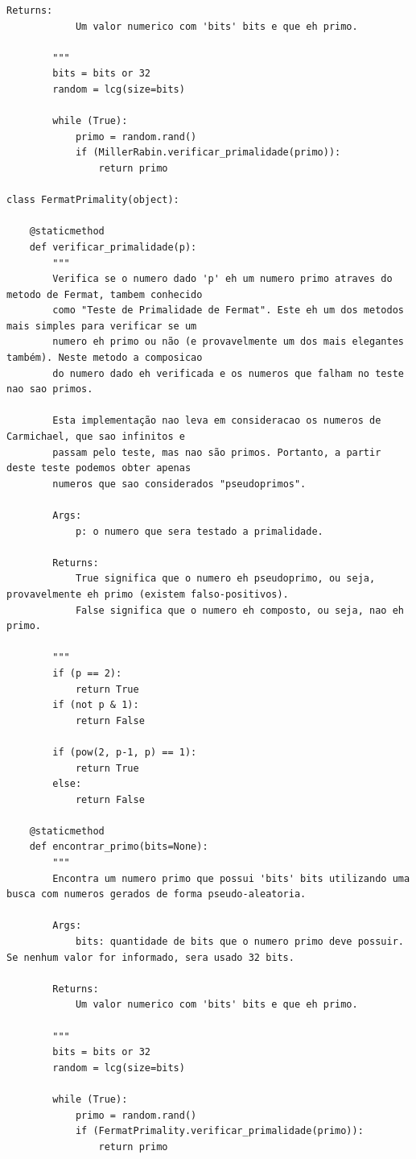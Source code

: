 \documentclass[a4paper,11pt]{article}
\theoremstyle{mytheor}
\begin{document}
\begin{lstlisting}[caption=Arquivo primality.py.]
        Returns:
            Um valor numerico com 'bits' bits e que eh primo.

        """
        bits = bits or 32
        random = lcg(size=bits)

        while (True):
            primo = random.rand()
            if (MillerRabin.verificar_primalidade(primo)):
                return primo

class FermatPrimality(object):

    @staticmethod
    def verificar_primalidade(p):
        """
        Verifica se o numero dado 'p' eh um numero primo atraves do metodo de Fermat, tambem conhecido 
        como "Teste de Primalidade de Fermat". Este eh um dos metodos mais simples para verificar se um 
        numero eh primo ou não (e provavelmente um dos mais elegantes também). Neste metodo a composicao
        do numero dado eh verificada e os numeros que falham no teste nao sao primos.

        Esta implementação nao leva em consideracao os numeros de Carmichael, que sao infinitos e
        passam pelo teste, mas nao são primos. Portanto, a partir deste teste podemos obter apenas
        numeros que sao considerados "pseudoprimos".

        Args:
            p: o numero que sera testado a primalidade.

        Returns:
            True significa que o numero eh pseudoprimo, ou seja, provavelmente eh primo (existem falso-positivos).
            False significa que o numero eh composto, ou seja, nao eh primo.

        """
        if (p == 2):
            return True
        if (not p & 1):
            return False

        if (pow(2, p-1, p) == 1):
            return True
        else:
            return False

    @staticmethod
    def encontrar_primo(bits=None):
        """
        Encontra um numero primo que possui 'bits' bits utilizando uma busca com numeros gerados de forma pseudo-aleatoria. 

        Args:
            bits: quantidade de bits que o numero primo deve possuir. Se nenhum valor for informado, sera usado 32 bits.
        
        Returns:
            Um valor numerico com 'bits' bits e que eh primo.

        """
        bits = bits or 32
        random = lcg(size=bits)

        while (True):
            primo = random.rand()
            if (FermatPrimality.verificar_primalidade(primo)):
                return primo


\end{lstlisting}
\end{document}

